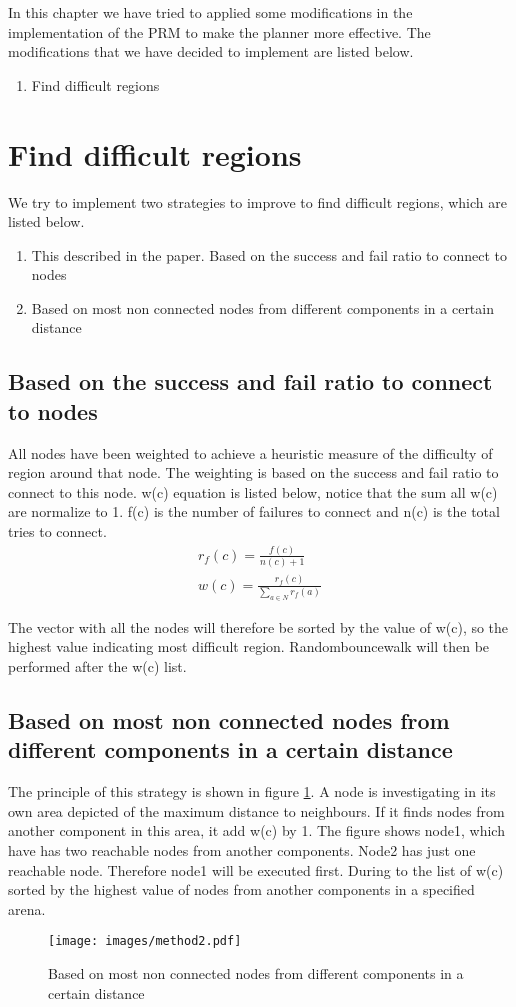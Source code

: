 In this chapter we have tried to applied some modifications in the implementation of the PRM to make the planner more effective. 
The modifications that we have decided to implement are listed below.
\begin{enumerate}
\item Find difficult regions
\end{enumerate}

\section{Find difficult regions}
We try to implement two strategies to improve to find difficult regions, which are listed below.
\begin{enumerate}
\item This described in the paper. Based on the success and fail ratio to connect to nodes  
\item Based on most non connected nodes from different components in a certain distance
\end{enumerate}

\subsection{Based on the success and fail ratio to connect to nodes }
All nodes have been weighted to achieve a heuristic measure of the difficulty of region around that node. The weighting is based on the success and fail ratio to connect to this node. w(c) equation is listed below, notice that the sum all w(c) are normalize to 1. f(c) is the number of failures to connect and n(c) is the total tries to connect.
\begin{align*}
	r_f(c) = \frac{f(c)}{n(c) + 1}	 \\
	w(c) = \frac{r_f(c)}{\sum_{a \in N} r_f(a) } 
\end{align*}

The vector with all the nodes will therefore be sorted by the value of w(c), so the highest value indicating most difficult region.
Randombouncewalk will then be performed after the w(c) list.

\subsection{Based on most non connected nodes from different components in a certain distance}
The principle of this strategy is shown in figure \ref{fig:method2}. A node is investigating in its own area depicted of the maximum distance to neighbours. If it finds nodes from another component in this area, it add w(c) by 1. The figure shows node1, which have has two reachable nodes from another components. Node2 has just one reachable node. Therefore node1 will be executed first.
During to the list of w(c) sorted by the highest value of nodes from another components in a specified arena.

\begin{figure}[h]
 \centering
 \texttt{[image: images/method2.pdf]}
 \caption{Based on most non connected nodes from different components in a certain distance}
 \label{fig:method2}
\end{figure}


